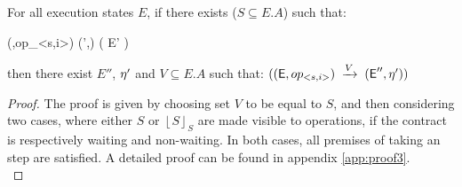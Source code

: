 %
%

\begin{theorem}
\label{theorem:three}
For all execution states $E$, if there
exists ($S\subseteq E.A$) such that: 
\begin{smathpar}
 {(\E,op_{<s,i>})} {} {(\E',\eff)} \spc \wedge \spc ( \psi {} E' )  
\end{smathpar}
then there exist  $E''$, $\eta'$ and $V\subseteq E.A$ such that:
$(({\normalfont \textsf{E}},op_{<s,i>})\;\xrightarrow{V}\;({\normalfont \textsf{E}}'',\eta'))$
\end{theorem}
\begin{proof}
The proof is given by choosing set $V$ to be equal to $S$, and then
considering two cases, where either $S$ or $\left \lfloor S \right
\rfloor_S$ are made visible to operations, if the contract is respectively
waiting and non-waiting. In both cases, all premises of taking an step
are satisfied.
A detailed proof can be found in appendix
\ref{app:proof3}.
\\
\end{proof}

